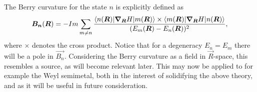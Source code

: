 The Berry curvature for the state $n$ is explicitly defined as~\cite{berryQuantalPhaseFactors1984}
\begin{equation}
  \bm{B_n}(\bm{R}) =
  -Im \sum_{m\neq n}
  \frac{
    \braket{n(\bm{R}) | \bm{\nabla}_{\bm{R}} H | m(\bm{R}) }
    \times
    \braket{m(\bm{R}) | \bm{\nabla}_{\bm{R}} H | n(\bm{R}) }
  }{
    (E_m(\bm{R}) - E_n(\bm{R}))^2
  },
\end{equation}
where $\times $ denotes the cross product.
Notice that for a degeneracy $E_n = E_m$ there will be a pole in $\vec{B_n}$.
Considering the Berry curvature as a field in $\vec{R}$-space, this resembles a source, as will become relevant later.
This may now be applied to for example the Weyl semimetal, both in the interest of solidifying the above theory, and as it will be useful in future consideration.

